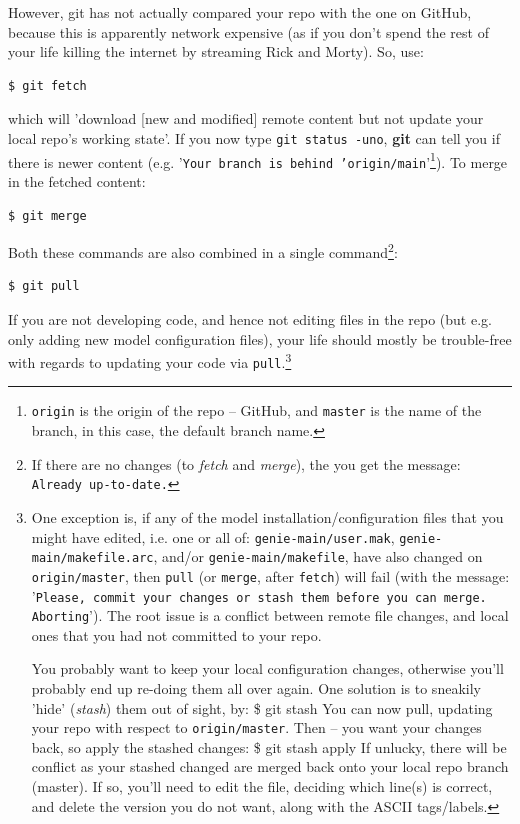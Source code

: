 \noindent However, git has not actually compared your repo with the one on GitHub, because this is apparently network expensive (as if you don't spend the rest of your life killing the internet by streaming Rick and Morty). So, use:

\vspace{-2mm}\small\begin{verbatim}
$ git fetch
\end{verbatim}\normalsize\vspace{-2mm}

\noindent which will 'download [new and modified] remote content but not update your local repo's working state'. If you now type \texttt{git status -uno}, \textbf{git} can tell you if there is newer content (e.g. '\texttt{Your branch is behind 'origin/main}'\footnote{\texttt{origin} is the origin of the repo -- GitHub, and \texttt{master} is the name of the branch, in this case, the default branch name.}). To merge in the fetched content:

\vspace{-2mm}\small\begin{verbatim}
$ git merge
\end{verbatim}\normalsize\vspace{-2mm}

Both these commands are also combined in a single command\footnote{If there are no changes (to \textit{fetch} and \textit{merge}), the you get the message: \texttt{Already up-to-date.}}:

\vspace{-2mm}\small\begin{verbatim}
$ git pull
\end{verbatim}\normalsize\vspace{-2mm}

If you are not developing code, and hence not editing files in the repo (but e.g. only adding new model configuration files), your life should mostly be trouble-free with regards to updating your code via \texttt{pull}.\footnote{
One exception is, if any of the model installation/configuration files that you might have edited, i.e. one or all of: \texttt{genie-main/user.mak}, \texttt{genie-main/makefile.arc}, and/or \texttt{genie-main/makefile}, have also changed on \texttt{origin/master}, then \texttt{pull} (or \texttt{merge}, after \texttt{fetch}) will fail (with the message: '\texttt{Please, commit your changes or stash them before you can merge. Aborting}'). The root issue is a conflict between remote file changes, and local ones that you had not committed to your repo.

You probably want to keep your local configuration changes, otherwise you'll probably end up re-doing them all over again. One solution is to sneakily 'hide' (\textit{stash}) them out of sight, by:
\$ git stash
\noindent You can now pull, updating your repo with respect to \texttt{origin/master}. Then -- you want your changes back, so apply the stashed changes:
\$ git stash apply
If unlucky, there will be conflict as your stashed changed are merged back onto your local repo branch (master). If so, you'll need to edit the file, deciding which line(s) is correct, and delete the version you do not want, along with the ASCII tags/labels.
}

